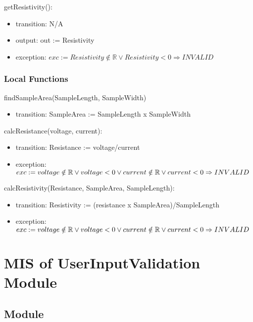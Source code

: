 \documentclass[12pt, titlepage]{article}
\begin{document}
\noindent getResistivity():
\begin{itemize}
\item transition: N/A
\item output: out := Resistivity
\item exception: $exc:= Resistivity \notin \mathbb{R} \lor Resistivity < 0  \Rightarrow INVALID$
\end{itemize}


\subsubsection{Local Functions}

findSampleArea(SampleLength, SampleWidth)
\begin{itemize}
  \item transition: SampleArea := SampleLength x SampleWidth
  \end{itemize}

  \noindent calcResistance(voltage, current):
  \begin{itemize}
  \item transition: Resistance := voltage/current 
  \item exception: $exc:= \\ 
  voltage \notin \mathbb{R} \lor voltage < 0 \\ 
  \lor current \notin \mathbb{R} \lor current < 0\\
   \Rightarrow INVALID$
  \end{itemize}
  
  \noindent calcResistivity(Resistance, SampleArea, SampleLength):
  \begin{itemize}
  \item transition: Resistivity := (resistance x SampleArea)/SampleLength
  \item exception: $exc:= \\ 
  voltage \notin \mathbb{R} \lor voltage < 0 \\ 
  \lor current \notin \mathbb{R} \lor current < 0\\
   \Rightarrow INVALID$
  \end{itemize}
\newpage

\section{MIS of UserInputValidation Module} \label{Module} 



\subsection{Module}
\end{document}
